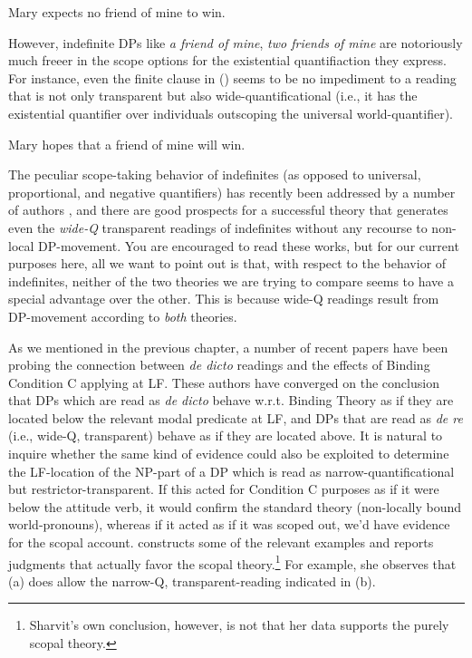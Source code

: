 \ex Mary expects no friend of mine to win. \xe

However, indefinite DPs like \emph{a friend of mine}, \emph{two friends of mine} are notoriously much freeer in the scope options for the existential quantifiaction they express. For instance, even the finite clause in (\nextx) seems to be no impediment to a reading that is not only transparent but also wide-quantificational (i.e., it has the existential quantifier over individuals outscoping the universal world-quantifier).

\ex Mary hopes that a friend of mine will win. \xe

The peculiar scope-taking behavior of indefinites (as opposed to universal, proportional, and negative quantifiers) has recently been addressed by a number of authors \citep{abusch:1994:indefinites, reinhart:scope:97, winter:choice:97, matthewson:widescope:99, kratzer:pseudo:98}, and there are good prospects for a successful theory that generates even the \emph{wide-Q} transparent readings of indefinites without any recourse to non-local DP-movement. You are encouraged to read these works, but for our current purposes here, all we want to point out is that, with respect to the behavior of indefinites, neither of the two theories we are trying to compare seems to have a special advantage over the other. This is because wide-Q readings result from DP-movement according to \emph{both} theories.

As we mentioned in the previous chapter, a number of recent papers have been probing the connection between \emph{de dicto} readings and the effects of Binding Condition C applying at LF. These authors have converged on the conclusion that DPs which are read as \emph{de dicto} behave w.r.t. Binding Theory as if they are located below the relevant modal predicate at LF, and DPs that are read as \emph{de re} (i.e., wide-Q, transparent) behave as if they are located above. It is natural to inquire whether the same kind of evidence could also be exploited to determine the LF-location of the NP-part of a DP which is read as narrow-quantificational but restrictor-transparent. If this acted for Condition C purposes as if it were below the attitude verb, it would confirm the standard theory (non-locally bound world-pronouns), whereas if it acted as if it was scoped out, we'd have evidence for the scopal account. \citet{sharvit:howmany:98} constructs some of the relevant examples and reports judgments that actually favor the scopal theory.\footnote{Sharvit's own conclusion, however, is not that her data supports the purely scopal theory.} For example, she observes that (\nextx a) does allow the narrow-Q, transparent-reading indicated in (\nextx b).

